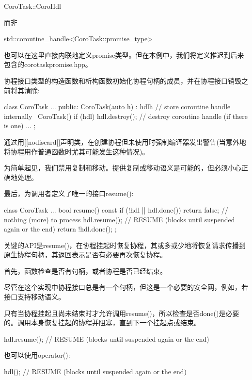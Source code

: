 \begin{cpp}
CoroTask::CoroHdl
\end{cpp}

而非

\begin{cpp}
std::coroutine_handle<CoroTask::promise_type>
\end{cpp}

也可以在这里直接内联地定义promise类型。但在本例中，我们将定义推迟到后来包含的corotaskpromise.hpp。

协程接口类型的构造函数和析构函数初始化协程句柄的成员，并在协程接口销毁之前将其清除:

\begin{cpp}
class CoroTask {
	...
	public:
	CoroTask(auto h)
	: hdl{h} { // store coroutine handle internally
	}
	~CoroTask() {
		if (hdl) {
			hdl.destroy(); // destroy coroutine handle (if there is one)
		}
	}
	...
};
\end{cpp}

通过用[[nodiscard]]声明类，在创建协程但未使用时强制编译器发出警告(当意外地将协程用作普通函数时尤其可能发生这种情况)。

为简单起见，我们禁用复制和移动。提供复制或移动语义是可能的，但必须小心正确地处理。

最后，为调用者定义了唯一的接口resume():

\begin{cpp}
class CoroTask {
	...
	bool resume() const {
		if (!hdl || hdl.done()) {
			return false; // nothing (more) to process
		}
		hdl.resume(); // RESUME (blocks until suspended again or the end)
		return !hdl.done();
	}
};
\end{cpp}

关键的API是resume()，在协程挂起时恢复协程，其或多或少地将恢复请求传播到原生协程句柄，其返回表示是否有必要再次恢复协程。

首先，函数检查是否有句柄，或者协程是否已经结束。

尽管在这个实现中协程接口总是有一个句柄，但这是一个必要的安全网，例如，若接口支持移动语义。

只有当协程挂起且尚未结束时才允许调用resume()，所以检查是否done()是必要的。调用本身恢复挂起的协程并阻塞，直到下一个挂起点或结束。

\begin{cpp}
hdl.resume(); // RESUME (blocks until suspended again or the end)
\end{cpp}

也可以使用operator():

\begin{cpp}
hdl(); // RESUME (blocks until suspended again or the end)
\end{cpp}

